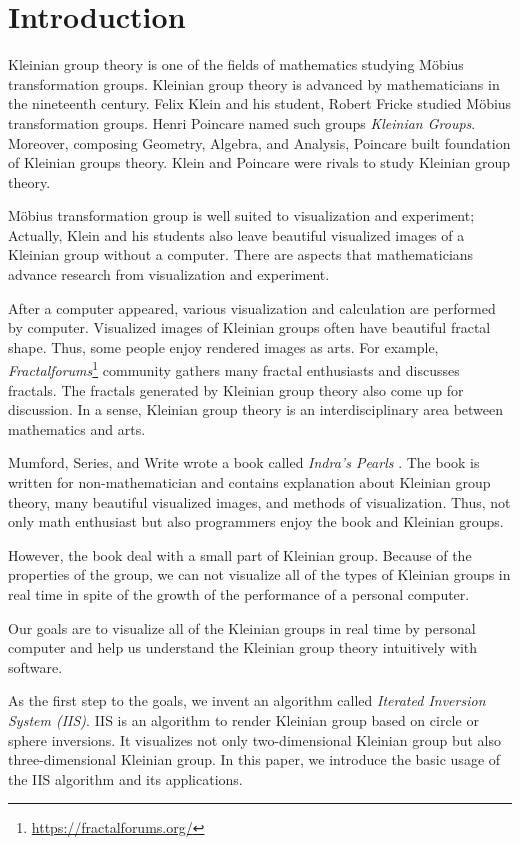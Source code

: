 
\section{Introduction}

Kleinian group theory is one of the fields of mathematics studying 
M\"obius transformation groups.
Kleinian group theory is advanced by mathematicians in the nineteenth
century.
Felix Klein and his student, Robert Fricke studied M\"obius
transformation groups.
Henri Poincare named such groups \textit{Kleinian Groups}.
Moreover, composing Geometry, Algebra, and Analysis,
Poincare built foundation of Kleinian groups theory.
Klein and Poincare were rivals to study Kleinian group theory.

M\"obius transformation group is well suited to visualization and
experiment; Actually, Klein and his students also leave beautiful
visualized images of a Kleinian group without a computer.
There are aspects that mathematicians advance research from
visualization and experiment.

After a computer appeared, various visualization and calculation are
performed by computer.
Visualized images of Kleinian groups often have beautiful fractal shape.
Thus, some people enjoy rendered images as arts.
For example,
\textit{Fractalforums}\footnote{\url{https://fractalforums.org/}}
community gathers many fractal enthusiasts and discusses fractals.
The fractals generated by Kleinian group theory also come up for
discussion.
In a sense, Kleinian group theory is an interdisciplinary area between
mathematics and arts.

Mumford, Series, and Write wrote a book called
\textit{Indra's Pearls} \cite{MumfordSeriesWright200204}.
The book is written for non-mathematician and contains explanation
about Kleinian group theory, many beautiful visualized images, and
methods of visualization.
Thus, not only math enthusiast but also programmers enjoy the book and
Kleinian groups.

However, the book deal with a small part of Kleinian group.
Because of the properties of the group, we can not
visualize all of the types of Kleinian groups in real time
in spite of the growth of the performance of a personal computer.

Our goals are to visualize all of the Kleinian groups in real time by
personal computer and help us understand the Kleinian group theory
intuitively with software.

As the first step to the goals, we invent an algorithm called
\textit{Iterated Inversion System (IIS)}.
IIS is an algorithm to render Kleinian group based on circle or sphere
inversions.
It visualizes not only two-dimensional Kleinian group but also
three-dimensional Kleinian group.
In this paper, we introduce the basic usage of the IIS algorithm and its
applications.


